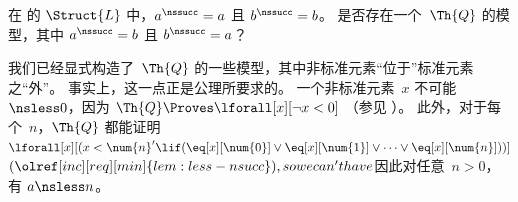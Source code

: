 \documentclass[../../../include/open-logic-section]{subfiles}
\begin{document}
\begin{prob}
在  的 $\Struct{L}$ 中，$a^\nssucc = a$ 且 $b^\nssucc = b$。
是否存在一个~$\Th{Q}$ 的模型，其中 $a^\nssucc = b$ 且 $b^\nssucc = a$？
\end{prob}

\begin{explain}
我们已经显式构造了~$\Th{Q}$ 的一些模型，其中非标准元素“位于”标准元素之“外”。
事实上，这一点正是公理所要求的。
一个非标准元素~$x$ 不可能 ${} \nsless 0$，因为 $\Th{Q} \Proves
\lforall[x][\lnot x<0]$ （参见 ）。
此外，对于每个~$n$，$\Th{Q}$ 都能证明 $\lforall[x][(x < \num{n}' \lif (\eq[x][\num{0}] \lor \eq[x][\num{1}] \lor \dots \lor \eq[x][\num{n}]))]$$ (\olref[inc][req][min]{lem:less-nsucc}), so we
can't have $因此对任意~$n>0$，有 $a \nsless n$。
\end{explain}
\end{document}
